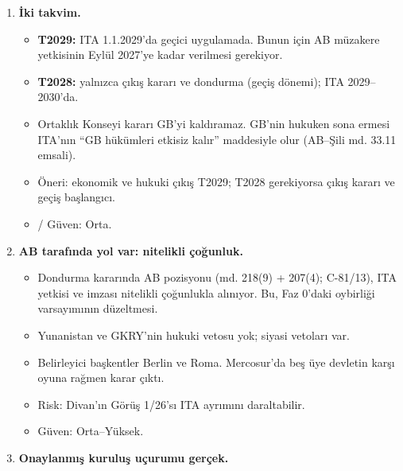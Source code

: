 \begin{enumerate}
  \begin{itemize}
  \tightlist
  \item
    İçerik: sanayide sıfır tarife, PEM ve tam kümülasyon, öncelikli sektörlerde ACAA, hizmetler, kamu alımı, karayolu, eşit rekabet koşulları; Türkiye'nin tarife özerkliği ve kendi STA ağı.
  \item
    Ara durum S3 (md. 207 ITA). Geçiş R7 (dondurma). Geri dönüş planı aktif S4.
  \item
    \etiketH{} Güven: Orta.
  \end{itemize}
\item
  \textbf{İki takvim.}

  \begin{itemize}
  \tightlist
  \item
    \textbf{T2029:} ITA 1.1.2029'da geçici uygulamada. Bunun için AB müzakere yetkisinin Eylül 2027'ye kadar verilmesi gerekiyor.
  \item
    \textbf{T2028:} yalnızca çıkış kararı ve dondurma (geçiş dönemi); ITA 2029--2030'da.
  \item
    Ortaklık Konseyi kararı GB'yi kaldıramaz. GB'nin hukuken sona ermesi ITA'nın ``GB hükümleri etkisiz kalır'' maddesiyle olur (AB--Şili md. 33.11 emsali).
  \item
    Öneri: ekonomik ve hukuki çıkış T2029; T2028 gerekiyorsa çıkış kararı ve geçiş başlangıcı.
  \item
    \etiketV{}/\etiketH{} Güven: Orta.
  \end{itemize}
\item
  \textbf{AB tarafında yol var: nitelikli çoğunluk.}

  \begin{itemize}
  \tightlist
  \item
    Dondurma kararında AB pozisyonu (md. 218(9) + 207(4); C-81/13), ITA yetkisi ve imzası nitelikli çoğunlukla alınıyor. Bu, Faz 0'daki oybirliği varsayımının düzeltmesi.
  \item
    Yunanistan ve GKRY'nin hukuki vetosu yok; siyasi vetoları var.
  \item
    Belirleyici başkentler Berlin ve Roma. Mercosur'da beş üye devletin karşı oyuna rağmen karar çıktı.
  \item
    Risk: Divan'ın Görüş 1/26'sı ITA ayrımını daraltabilir.
  \item
    \etiketV{} Güven: Orta--Yüksek.
  \end{itemize}
\item
  \textbf{Onaylanmış kuruluş uçurumu gerçek.}


\end{enumerate}

